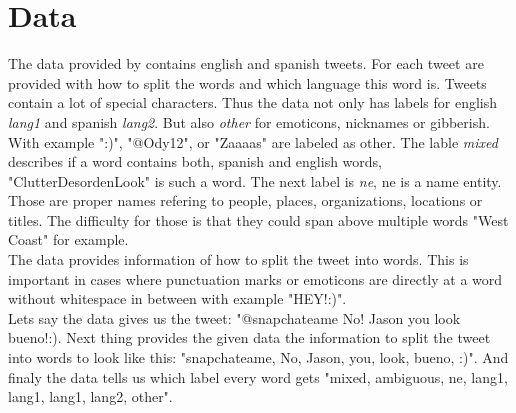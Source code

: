 \section{Data}\label{sec:Data}
The data provided by \cite{workshop} contains english and spanish tweets. For each tweet are provided with how to split the words and which language this word is. Tweets contain a lot of special characters. Thus the data not only has labels for english \textit{lang1} and spanish \textit{lang2}. But also \textit{other} for emoticons, nicknames or gibberish. With example ":)", "@Ody12", or "Zaaaas" are labeled as other. The lable \textit{mixed} describes if a word contains both, spanish and english words, "ClutterDesordenLook" is such a word.  The next label is \textit{ne}, ne is a name entity. Those are proper names refering to people, places, organizations, locations or titles. The difficulty for those is that they could span above multiple words "West Coast" for example. \\
The data provides information of how to split the tweet into words. This is important in cases where punctuation marks or emoticons are directly at a word without whitespace in between with example "HEY!:)". \\
Lets say the data gives us the tweet: "@snapchateame No! Jason you look bueno!:). Next thing provides the given data the information to split the tweet into words to look like this: "snapchateame, No, Jason, you, look, bueno, :)". And finaly the data tells us which label every word gets "mixed, ambiguous, ne, lang1, lang1, lang1, lang2, other". \\
